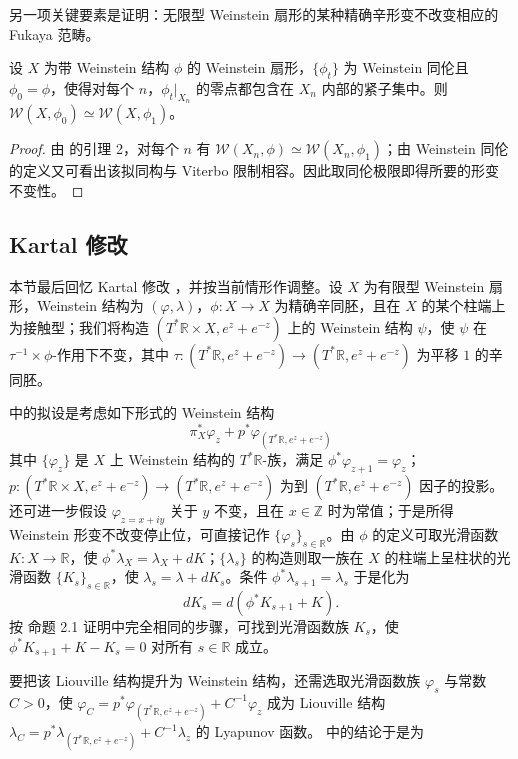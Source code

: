     另一项关键要素是证明：无限型 Weinstein 扇形的某种精确辛形变不改变相应的 Fukaya 范畴。
\begin{prp}\label{prp:deformation-invariance-Fukaya}
    设 $X$ 为带 Weinstein 结构 $\phi$ 的 Weinstein 扇形，$\{\phi_t\}$ 为 Weinstein 同伦且 $\phi_0=\phi$，使得对每个 $n$，$\phi_t\vert_{X_n}$ 的零点都包含在 $X_n$ 内部的紧子集中。则 $\mathcal{W} (X,\phi_0)\simeq\mathcal{W} (X,\phi_1)$。
\end{prp}
\begin{proof}
    由 \cite{Jeffs22} 的引理 2，对每个 $n$ 有 $\mathcal{W} (X_n,\phi)\simeq\mathcal{W} (X_n,\phi_1)$；由 Weinstein 同伦的定义又可看出该拟同构与 Viterbo 限制相容。因此取同伦极限即得所要的形变不变性。
\end{proof}

\subsection{Kartal 修改}
    本节最后回忆 Kartal 修改 \cite{Kartal21}，并按当前情形作调整。设 $X$ 为有限型 Weinstein 扇形，Weinstein 结构为 $(\varphi,\lambda)$，$\phi\colon X\to X$ 为精确辛同胚，且在 $X$ 的某个柱端上为接触型；我们将构造 $(T^{\ast}\mathbb{R}\times X,e^z+e^{-z})$ 上的 Weinstein 结构 $\psi$，使 $\psi$ 在 $\tau^{-1}\times\phi$-作用下不变，其中 $\tau\colon (T^{\ast}\mathbb{R},e^z+e^{-z})\to (T^{\ast}\mathbb{R},e^z+e^{-z})$ 为平移 $1$ 的辛同胚。\par
    \cite{Kartal21} 中的拟设是考虑如下形式的 Weinstein 结构
\[
\pi_X^{\ast}\varphi_z +p^{\ast}\varphi_{(T^{\ast}\mathbb{R},e^z+e^{-z})}
\]
其中 $\{\varphi_z\}$ 是 $X$ 上 Weinstein 结构的 $T^{\ast}\mathbb{R}$-族，满足 $\phi^{\ast}\varphi_{z+1}=\varphi_z$；$p\colon (T^{\ast}\mathbb{R}\times X,e^z+e^{-z})\to (T^{\ast}\mathbb{R},e^z+e^{-z})$ 为到 $(T^{\ast}\mathbb{R},e^z+e^{-z})$ 因子的投影。还可进一步假设 $\varphi_{z=x+iy}$ 关于 $y$ 不变，且在 $x\in\mathbb{Z}$ 时为常值；于是所得 Weinstein 形变不改变停止位，可直接记作 $\{\varphi_s\}_{s\in\mathbb{R}}$。由 $\phi$ 的定义可取光滑函数 $K\colon X\to\mathbb{R}$，使 $\phi^{\ast}\lambda_X=\lambda_X+dK$；$\{\lambda_s\}$ 的构造则取一族在 $X$ 的柱端上呈柱状的光滑函数 $\{K_s\}_{s\in\mathbb{R}}$，使 $\lambda_s =\lambda +dK_s$。条件 $\phi^{\ast}\lambda_{s+1}=\lambda_s$ 于是化为
\[
    dK_s=d(\phi^{\ast} K_{s+1}+K).
\]
按 \cite{Kartal21} 命题 2.1 证明中完全相同的步骤，可找到光滑函数族 $K_s$，使 $\phi^{\ast} K_{s+1} +K-K_s=0$ 对所有 $s\in\mathbb{R}$ 成立。\par
    要把该 Liouville 结构提升为 Weinstein 结构，还需选取光滑函数族 $\varphi_s$ 与常数 $C>0$，使 $\varphi_C =p^{\ast}\varphi_{(T^{\ast}\mathbb{R},e^z+e^{-z})} +C^{-1}\varphi_z$ 成为 Liouville 结构 $\lambda_C =p^{\ast}\lambda_{(T^{\ast}\mathbb{R},e^z+e^{-z})} +C^{-1}\lambda_z$ 的 Lyapunov 函数。\cite{Kartal21} 中的结论于是为
